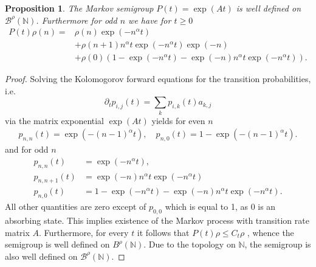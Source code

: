 \documentclass[a4paper,12pt]{article}
\newtheorem{proposition}[theorem]{Proposition}
\theoremstyle{definition}
\theoremstyle{remark}
\numberwithin{equation}{section}
\numberwithin{theorem}{section}
\begin{document}
\begin{proposition}
  The Markov semigroup $P(t) = \exp (At)$ is well defined on $\mathscr{B}^{\rho}(\mathbb{N})$.
  Furthermore for odd $n$ we have   for $t \geq 0$
\begin{align*}
     P(t) \rho (n) =& \rho (n) \exp (- n^\alpha t) \\&+ \rho (n+1) n^{\alpha} t \exp (- n^{\alpha} t) \exp(-n)
     \\ &+ \rho (0) \left(1 - \exp (- n^\alpha t) -\exp (- n) n^\alpha t \exp (- n^{\alpha} t)\right). 
\end{align*}

\end{proposition}
\begin{proof}
Solving the Kolomogorov forward equations for the transition probabilities, i.e.
\[
\partial_t p_{i,j}(t)= \sum_{k} p_{i,k}(t) a_{k,j}
\]
via the matrix exponential $\exp(At)$
yields for even $n$
\begin{align*}
p_{n,n} (t) = \exp (- (n-1)^{\alpha} t), \quad
p_{n,0} (t) = 1 - \exp (-(n-1)^{\alpha} t).
\end{align*}
 and for odd $n$ 
 \begin{align*}
 p_{n,n} (t) &= \exp (- n^\alpha t), \\ p_{n,n+1} (t)&
 =\exp(-n)  n^\alpha t \exp(-n^{\alpha}t)
 \\ p_{n,0} (t)&= 
1 - \exp (- n^\alpha t) -\exp(-n)  n^\alpha t \exp(-n^{\alpha}t).
\end{align*}
All other quantities are zero except of $p_{0,0}$ which is equal to 1, 
as $0$ is an absorbing state.
This implies existence of the Markov process with transition rate matrix $A$. Furthermore, for every $t$ it follows that $P(t) \rho \leq C_t \rho$ , whence the
semigroup is well defined on $B^{\rho}(\mathbb{N})$. Due to the topology on $\mathbb{N}$, the semigroup is also well defined on  $\mathscr{B}^{\rho}(\mathbb{N})$.
\end{proof}
\end{document}
